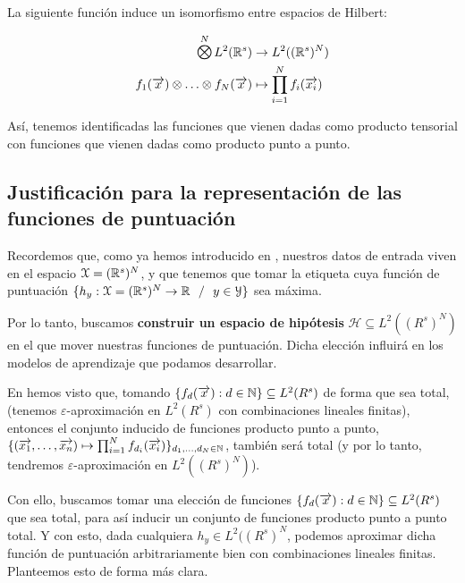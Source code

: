 \begin{teorema}
    La siguiente función induce un isomorfismo entre espacios de Hilbert:

    \begin{equation}
    \begin{split}
        \MediumOtimes^{N} L^2(\R^s) &\to L^2((\R^s)^N) \\
        f_1(\nv{x}) \otimes \ldots \otimes f_N(\nv{x}) &\mapsto \prod_{i = 1}^N f_i(\nv{x_i})
    \end{split}
    \end{equation}

    Así, tenemos identificadas las funciones que vienen dadas como producto tensorial con funciones que vienen dadas como producto punto a punto.
\end{teorema}


\subsection{Justificación para la representación de las funciones de puntuación} \label{sec:justificacion_func_repr}

Recordemos que, como ya hemos introducido en , nuestros datos de entrada viven en el espacio $\mathcal{X} = (\mathbb{R}^s)^N$, y que tenemos que tomar la etiqueta cuya función de puntuación $\{h_y: \mathcal{X} = (\mathbb{R}^s)^N \to \mathbb{R} \ \  / \ \  y \in \mathcal{Y} \}$ sea máxima.

Por lo tanto, buscamos \textbf{construir un espacio de hipótesis} $\mathcal{H} \subseteq L^2((R^s)^N)$ en el que mover nuestras funciones de puntuación. Dicha elección influirá en los modelos de aprendizaje que podamos desarrollar.

En  hemos visto que, tomando $\{f_d(\overrightarrow{x}): d \in \mathbb{N}\} \subseteq L^2(R^s)$ de forma que sea total, (tenemos $\varepsilon$-aproximación en $L^2(R^s)$ con combinaciones lineales finitas), entonces el conjunto inducido de funciones producto punto a punto, $\{(\overrightarrow{x_1}, \ldots, \overrightarrow{x_n}) \mapsto \prod_{i = 1}^N f_{d_i}(\overrightarrow{x_i}) \}_{d_1, \ldots, d_N \in \mathbb{N}}$, también será total (y por lo tanto, tendremos $\varepsilon$-aproximación en $L^2((R^s)^N)$).

Con ello, buscamos tomar una elección de funciones $\{f_d(\overrightarrow{x}): d \in \mathbb{N}\} \subseteq L^2(R^s)$ que sea total, para así inducir un conjunto de funciones producto punto a punto total. Y con esto, dada cualquiera $h_y \in L^2((R^s)^N$, podemos aproximar dicha función de puntuación arbitrariamente bien con combinaciones lineales finitas. Planteemos esto de forma más clara.

